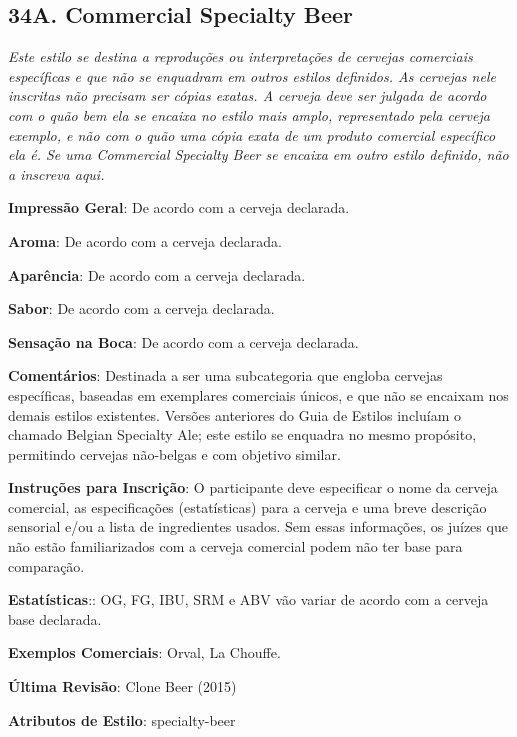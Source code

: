 \subsection*{34A. Commercial Specialty Beer}

\textit{Este estilo se destina a reproduções ou interpretações de cervejas comerciais específicas e que não se enquadram em outros estilos definidos. As cervejas nele inscritas não precisam ser cópias exatas. A cerveja deve ser julgada de acordo com o quão bem ela se encaixa no estilo mais amplo, representado pela cerveja exemplo, e não com o quão uma cópia exata de um produto comercial específico ela é. Se uma Commercial Specialty Beer se encaixa em outro estilo definido, não a inscreva aqui.}

\textbf{Impressão Geral}: De acordo com a cerveja declarada.

\textbf{Aroma}: De acordo com a cerveja declarada.

\textbf{Aparência}: De acordo com a cerveja declarada.

\textbf{Sabor}: De acordo com a cerveja declarada.

\textbf{Sensação na Boca}: De acordo com a cerveja declarada.

\textbf{Comentários}: Destinada a ser uma subcategoria que engloba cervejas específicas, baseadas em exemplares comerciais únicos, e que não se encaixam nos demais estilos existentes. Versões anteriores do Guia de Estilos incluíam o chamado Belgian Specialty Ale; este estilo se enquadra no mesmo propósito, permitindo cervejas não-belgas e com objetivo similar.

\textbf{Instruções para Inscrição}: O participante deve especificar o nome da cerveja comercial, as especificações (estatísticas) para a cerveja e uma breve descrição sensorial e/ou a lista de ingredientes usados. Sem essas informações, os juízes que não estão familiarizados com a cerveja comercial podem não ter base para comparação.

\textbf{Estatísticas}:: OG, FG, IBU, SRM e ABV vão variar de acordo com a cerveja base declarada.

\textbf{Exemplos Comerciais}: Orval, La Chouffe.

\textbf{Última Revisão}: Clone Beer (2015)

\textbf{Atributos de Estilo}: specialty-beer


